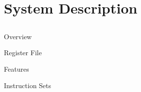 \section{System Description}
\subsection{}

\begin{frame}{Overview}

\end{frame}

\begin{frame}{Register File}
\end{frame}

\begin{frame}{Features}
\end{frame}

\begin{frame}{Instruction Sets}
\end{frame}
